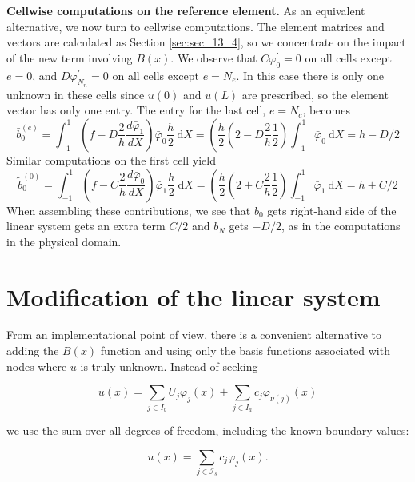 \documentclass[../main.tex]{subfiles}
\begin{document}
		\noindent \textbf{Cellwise computations on the reference element.   } As an equivalent alternative, we now turn to cellwise computations. The element matrices and vectors are calculated as Section \ref{sec:sec_13_4}, so we concentrate on the impact of the new term involving $B(x)$. We observe that $C \varphi_{0}^{\prime}=0$ on all cells except $e=0$, and $D \varphi_{N_{n}}^{\prime}=0$ on all cells except $e=N_{e}$. In this case there is only one unknown in these cells since $u(0)$ and $u(L)$ are prescribed, so the element vector has only one entry. The entry for the last cell, $e=N_{c}$, becomes
		$$
		\bar{b}_{0}^{(e)}=\int_{-1}^{1}\left(f-D \frac{2}{h} \frac{d \bar{\varphi}_{1}}{d X}\right) \bar{\varphi}_{0} \frac{h}{2} \mathrm{~d} X=\left(\frac{h}{2}\left(2-D \frac{2}{h} \frac{1}{2}\right) \int_{-1}^{1} \bar{\varphi}_{0} \mathrm{~d} X=h-D / 2\right.
		$$
		Similar computations on the first cell yield
		$$
		\tilde{b}_{0}^{(0)}=\int_{-1}^{1}\left(f-C \frac{2}{h} \frac{d \bar{\varphi}_{0}}{d X}\right) \bar{\varphi}_{1} \frac{h}{2} \mathrm{~d} X=\left(\frac{h}{2}\left(2+C \frac{2}{h} \frac{1}{2}\right) \int_{-1}^{1} \bar{\varphi}_{1} \mathrm{~d} X=h+C / 2\right.
		$$
		When assembling these contributions, we see that $b_{0}$ gets right-hand side of the linear system gets an extra term $C / 2$ and $b_{N}$ gets $-D / 2$, as in the computations in the physical domain.\bigbreak 
	
	\section[Modification of the linear system]{Modification of the linear system}
		\label{sec:sec_14_3}
		\noindent From an implementational point of view, there is a convenient alternative to adding the $B(x)$ function and using only the basis functions associated with nodes where $u$ is truly unknown. Instead of seeking
		
		\begin{equation}
			\label{eqa181}
			u(x)=\sum_{j \in I_{b}} U_{j} \varphi_{j}(x)+\sum_{j \in I_{a}} c_{j} \varphi_{\nu(j)}(x)
		\end{equation}
	
		\noindent we use the sum over all degrees of freedom, including the known boundary values:
		
		\begin{equation}
			\label{eqa182}
			u(x)=\sum_{j \in \mathcal{I}_{s}} c_{j} \varphi_{j}(x) .
		\end{equation}
	
\end{document}
